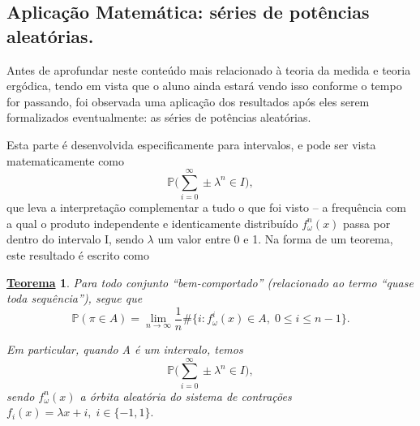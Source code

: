 \documentclass[12pt]{article}
\newtheorem*{theorem*}{\underline{Teorema}}
\theoremstyle{definition}
\begin{document}
\subsection*{Aplicação Matemática: séries de potências aleatórias.}
Antes de aprofundar neste conteúdo mais relacionado à teoria da medida e teoria ergódica, tendo em vista que o aluno ainda estará vendo isso conforme o tempo for passando, foi observada uma aplicação dos resultados após eles serem formalizados eventualmente: as séries de potências aleatórias.

Esta parte é desenvolvida especificamente para intervalos, e pode ser vista matematicamente como
\[
	\mathbb{P}\biggl(\sum_{i=0}^{\infty}\pm \lambda^{n}\in I\biggr),
\]
que leva a interpretação complementar a tudo o que foi visto -- a frequência com a qual o produto independente e identicamente distribuído \(f_{\omega }^{n}(x)\) passa por dentro do intervalo I, sendo \(\lambda \) um valor entre 0 e 1. Na forma de um teorema, este resultado é escrito como
\begin{theorem*}
	Para todo conjunto ``bem-comportado'' (relacionado ao termo ``quase toda sequência''), segue que
	\[
		\mathbb{P}(\pi \in A) = \lim_{n\to \infty}\frac{1}{n}\# \biggl\{i: f_{\omega }^{i}(x)\in A,\; 0\leq i\leq n-1\biggr\}.
	\]

	Em particular, quando A é um intervalo, temos
	\[
		\mathbb{P}\biggl(\sum_{i=0}^{\infty}\pm \lambda^{n}\in I\biggr),
	\]
	sendo \(f_{\omega }^{n}(x)\) a órbita aleatória do sistema de contrações \(f_{i}(x) = \lambda x + i,\; i\in \{-1, 1\}.\)
\end{theorem*}
\end{document}
